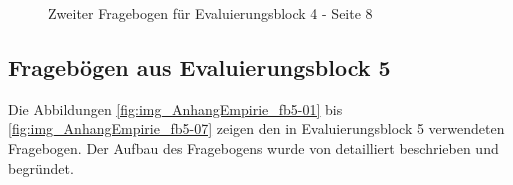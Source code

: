 \begin{figure}[htbp]
	\centering
	\caption{Zweiter Fragebogen für Evaluierungsblock 4 - Seite 8}
	\label{fig:img_AnhangEmpirie_fb4_2-08}
\end{figure}

\clearpage
\subsection{Fragebögen aus Evaluierungsblock 5}
\label{sub:fb_eval5}

Die Abbildungen \ref{fig:img_AnhangEmpirie_fb5-01} bis \ref{fig:img_AnhangEmpirie_fb5-07} zeigen den in Evaluierungsblock 5 verwendeten Fragebogen. Der Aufbau des Fragebogens wurde von \citet{Bindreiter10} detailliert beschrieben und begründet.

